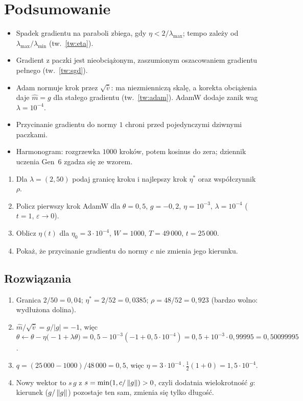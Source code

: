 \section*{Podsumowanie}
\begin{itemize}
\item Spadek gradientu na paraboli zbiega, gdy $\eta<2/\lambda_{\max}$; tempo zależy od $\lambda_{\max}/\lambda_{\min}$ (tw.~\ref{tw:eta}).
\item Gradient z paczki jest nieobciążonym, zaszumionym oszacowaniem gradientu pełnego (tw.~\ref{tw:sgd}).
\item Adam normuje krok przez $\sqrt{\hat v}$: ma niezmienniczą skalę, a korekta obciążenia daje $\hat m=g$ dla stałego gradientu (tw.~\ref{tw:adam}). AdamW dodaje zanik wag $\lambda=10^{-4}$.
\item Przycinanie gradientu do normy $1$ chroni przed pojedynczymi dziwnymi paczkami.
\item Harmonogram: rozgrzewka $1000$ kroków, potem kosinus do zera; dziennik uczenia Gen~6 zgadza się ze wzorem.
\end{itemize}

\begin{sprawdz}
\begin{enumerate}
\item Dla $\lambda=(2,50)$ podaj granicę kroku i najlepszy krok $\eta^\ast$ oraz współczynnik $\rho$.
\item Policz pierwszy krok AdamW dla $\theta=0{,}5$, $g=-0{,}2$, $\eta=10^{-3}$, $\lambda=10^{-4}$ ($t=1$, $\varepsilon\to0$).
\item Oblicz $\eta(t)$ dla $\eta_0=3\cdot10^{-4}$, $W=1000$, $T=49\,000$, $t=25\,000$.
\item Pokaż, że przycinanie gradientu do normy $c$ nie zmienia jego kierunku.
\end{enumerate}
\end{sprawdz}

\subsection*{Rozwiązania}
\begin{enumerate}
\item Granica $2/50=0{,}04$; $\eta^\ast=2/52=0{,}0385$; $\rho=48/52=0{,}923$ (bardzo wolno: wydłużona dolina).
\item $\hat m/\sqrt{\hat v}=g/|g|=-1$, więc $\theta\leftarrow\theta-\eta\big(-1+\lambda\theta\big)=0{,}5-10^{-3}(-1+0{,}5\cdot10^{-4})=0{,}5+10^{-3}\cdot0{,}99995=0{,}50099995$.
\item $q=(25\,000-1000)/48\,000=0{,}5$, więc $\eta=3\cdot10^{-4}\cdot\tfrac12(1+0)=1{,}5\cdot10^{-4}$.
\item Nowy wektor to $s\,g$ z $s=\min(1,c/\left\lVert g\right\rVert)>0$, czyli dodatnia wielokrotność $g$: kierunek ($g/\left\lVert g\right\rVert$) pozostaje ten sam, zmienia się tylko długość.
\end{enumerate}
